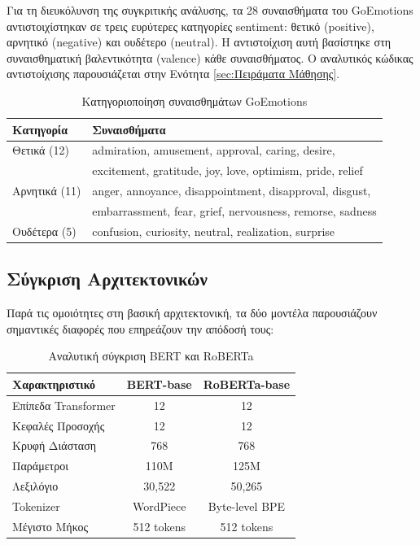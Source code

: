 \documentclass[a4paper,11pt,oneside,openany]{ioniothesis}
\begin{document}
Για τη διευκόλυνση της συγκριτικής ανάλυσης, τα 28 συναισθήματα του GoEmotions αντιστοιχίστηκαν σε τρεις ευρύτερες κατηγορίες sentiment: θετικό (positive), αρνητικό (negative) και ουδέτερο (neutral). Η αντιστοίχιση αυτή βασίστηκε στη συναισθηματική βαλεντικότητα (valence) κάθε συναισθήματος. Ο αναλυτικός κώδικας αντιστοίχισης παρουσιάζεται στην Ενότητα \ref{sec:Πειράματα Μάθησης}.

\begin{table}[htbp]
\centering
\caption{Κατηγοριοποίηση συναισθημάτων GoEmotions}
\label{tab:emotion_categories}
\begin{tabular}{@{}ll@{}}
\toprule
\textbf{Κατηγορία} & \textbf{Συναισθήματα} \\
\midrule
Θετικά (12) & admiration, amusement, approval, caring, desire, \\
            & excitement, gratitude, joy, love, optimism, pride, relief \\
\midrule
Αρνητικά (11) & anger, annoyance, disappointment, disapproval, disgust, \\
              & embarrassment, fear, grief, nervousness, remorse, sadness \\
\midrule
Ουδέτερα (5) & confusion, curiosity, neutral, realization, surprise \\
\bottomrule
\end{tabular}
\end{table}

\subsection{Σύγκριση Αρχιτεκτονικών}
\label{sec:Σύγκριση Αρχιτεκτονικών}

Παρά τις ομοιότητες στη βασική αρχιτεκτονική, τα δύο μοντέλα παρουσιάζουν σημαντικές διαφορές που επηρεάζουν την απόδοσή τους:

\begin{table}[htbp]
\centering
\caption{Αναλυτική σύγκριση BERT και RoBERTa}
\label{tab:detailed_comparison}
\begin{tabular}{@{}lcc@{}}
\toprule
\textbf{Χαρακτηριστικό} & \textbf{BERT-base} & \textbf{RoBERTa-base} \\
\midrule
Επίπεδα Transformer & 12 & 12 \\
Κεφαλές Προσοχής & 12 & 12 \\
Κρυφή Διάσταση & 768 & 768 \\
Παράμετροι & 110M & 125M \\
Λεξιλόγιο & 30,522 & 50,265 \\
Tokenizer & WordPiece & Byte-level BPE \\
Μέγιστο Μήκος & 512 tokens & 512 tokens \\
\bottomrule
\end{tabular}
\end{table}
\end{document}
